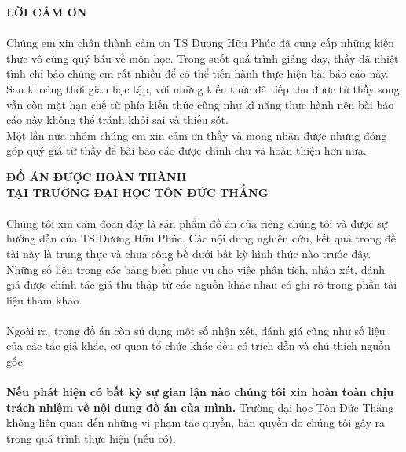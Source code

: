 \documentclass{report}
\begin{document}
\pagestyle{fancy}
\fancyhf{}
\chead{\thepage}
\renewcommand{\headrulewidth}{0pt}
\begin{center}
	\setcounter{page}{1}
	\fontsize{16}{20}\selectfont
	\textbf{LỜI CẢM ƠN\\} 
\end{center}
	\fontsize{13}{15}\selectfont
	\paragraph{}
    Chúng em xin chân thành cảm ơn TS Dương Hữu Phúc đã cung cấp những kiến thức vô cùng quý báu về môn học. Trong suốt quá trình giảng dạy, thầy đã nhiệt tình chỉ bảo chúng em rất nhiều để có thể tiến hành thực hiện bài báo cáo này. \\
    \indent Sau khoảng thời gian học tập, với những kiến thức đã tiếp thu được từ thầy song vẫn còn mặt hạn chế từ phía kiến thức cũng như kĩ năng thực hành nên bài báo cáo này không thể tránh khỏi sai và thiếu sót.\\
    \indent Một lần nữa nhóm chúng em xin cảm ơn thầy và mong nhận được những đóng góp quý giá từ thầy để bài báo cáo được chỉnh chu và hoàn thiện hơn nữa.
\pagebreak

\begin{center}
	\fontsize{16}{20}\selectfont
	\textbf{ĐỒ ÁN ĐƯỢC HOÀN THÀNH}\\
	\textbf{TẠI TRƯỜNG ĐẠI HỌC TÔN ĐỨC THẮNG\\} 
\end{center}
\fontsize{13}{15}\selectfont
\paragraph{}
Chúng tôi xin cam đoan đây là sản phẩm đồ án của riêng  chúng tôi và được sự hướng dẫn của TS Dương Hữu Phúc. Các nội dung nghiên cứu, kết quả trong đề tài này là trung thực và chưa công bố dưới bất kỳ hình thức nào trước đây. Những số liệu trong các bảng biểu phục vụ cho việc phân tích, nhận xét, đánh giá được chính tác giả thu thập từ các nguồn khác nhau có ghi rõ trong phần tài liệu tham khảo.
\paragraph{}
Ngoài ra, trong đồ án còn sử dụng một số nhận xét, đánh giá cũng như số liệu của các tác giả khác, cơ quan tổ chức khác đều có trích dẫn và chú thích nguồn gốc.
\paragraph{}
\textbf{Nếu phát hiện có bất kỳ sự gian lận nào chúng tôi xin hoàn toàn chịu trách nhiệm về nội dung đồ án của mình.} Trường đại học Tôn Đức Thắng không liên quan đến những vi phạm tác quyền, bản quyền do chúng tôi gây ra trong quá trình thực hiện (nếu có).
\end{document}
